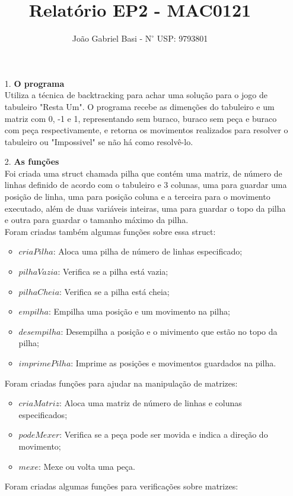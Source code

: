 \documentclass[12pt, a4paper]{article} %
\title{Relatório EP2 - MAC0121}
\date{}
\author{João Gabriel Basi - $\text{N}^\circ$ USP: 9793801}
\begin{document}
\maketitle
\begin{enumerate}
\large
\item[1.]\textbf{O programa}
\normalsize\\[0.5cm]
Utiliza a técnica de backtracking para achar uma solução para o jogo de tabuleiro "Resta Um". O programa recebe as dimenções do tabuleiro e um matriz com 0, -1 e 1, representando sem buraco, buraco sem peça e buraco com peça respectivamente, e retorna os movimentos realizados para resolver o tabuleiro ou "Impossivel" se não há como resolvê-lo.\\
\large
\item[2.]\textbf{As funções}
\normalsize\\[0.5cm]
Foi criada uma struct chamada pilha que contém uma matriz, de número de linhas definido de acordo com o tabuleiro e 3 colunas, uma para guardar uma posição de linha, uma para posição coluna e a terceira para o movimento executado, além de duas variáveis inteiras, uma para guardar o topo da pilha e outra para guardar o tamanho máximo da pilha.\\
Foram criadas também algumas funções sobre essa struct:
\begin{itemize}
\item $criaPilha$: Aloca uma pilha de número de linhas especificado;
\item $pilhaVazia$: Verifica se a pilha está vazia;
\item $pilhaCheia$: Verifica se a pilha está cheia;
\item $empilha$: Empilha uma posição e um movimento na pilha;
\item $desempilha$: Desempilha a posição e o mivimento que estão no topo da pilha;
\item $imprimePilha$: Imprime as posições e movimentos guardados na pilha.
\end{itemize}
Foram criadas funções para ajudar na manipulação de matrizes:
\begin{itemize}
\item $criaMatriz$: Aloca uma matriz de número de linhas e colunas especificados;
\item $podeMexer$: Verifica se a peça pode ser movida e indica a direção do movimento;
\item $mexe$: Mexe ou volta uma peça.
\end{itemize}
Foram criadas algumas funções para verificações sobre matrizes:

\end{enumerate}
\end{document}
